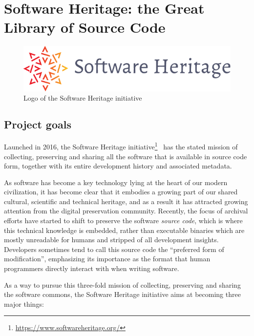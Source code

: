 \chapter{Software Heritage: the Great Library of Source Code}

\begin{figure}
    \centering
    \includegraphics[width=0.5\linewidth]{../img/SWH-logo}
    \caption{Logo of the Software Heritage initiative}
\end{figure}

\section{Project goals}

Launched in 2016, the Software Heritage
initiative\footnote{\url{https://www.softwareheritage.org/}}~\cite{swhcacm2018}
has the stated mission of collecting, preserving and sharing all the software
that is available in source code form, together with its entire development
history and associated metadata.

As software has become a key technology lying at the heart of our modern
civilization, it has become clear that it embodies a growing part of our shared
cultural, scientific and technical heritage, and as a result it has attracted
growing attention from the digital preservation community.
Recently, the focus of archival efforts have started to shift to preserve the
software \emph{source code}, which is where this technical knowledge is
embedded, rather than executable binaries which are mostly unreadable for
humans and stripped of all development insights. Developers sometimes tend to
call this source code the ``preferred form of modification'', emphasizing its
importance as the format that human programmers directly interact with when
writing software.

As a way to pursue this three-fold mission of collecting, preserving and
sharing the software commons, the Software Heritage initiative aims at becoming
three major things:

